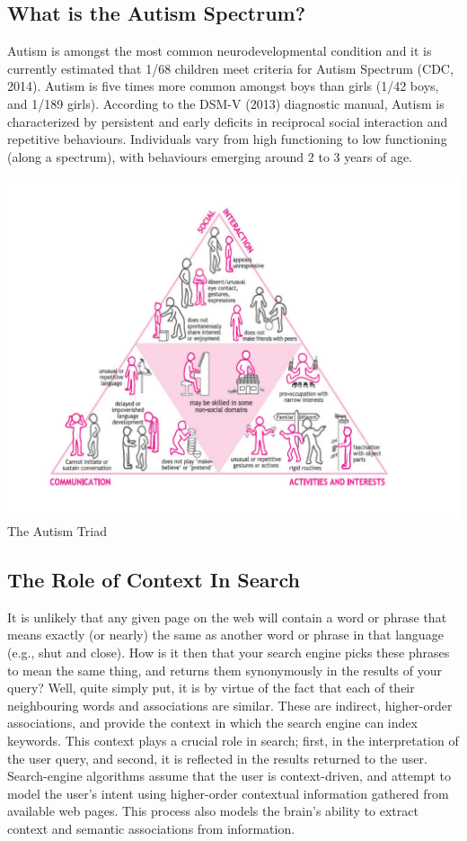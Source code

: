 \documentclass[10pt]{article}
\begin{document}
\subsection{What is the Autism Spectrum?}
Autism is amongst the most common neurodevelopmental condition and it is currently estimated that 1/68 children meet criteria for Autism Spectrum (CDC, 2014). Autism is five times more common amongst boys than girls (1/42 boys, and 1/189 girls). According to the DSM-V (2013) diagnostic manual, Autism is characterized by persistent and early deficits in reciprocal social interaction and repetitive behaviours. Individuals vary from high functioning to low functioning (along a spectrum), with behaviours emerging around 2 to 3 years of age. 

\begin{center}
\includegraphics[scale=0.5]{asd}\\
The Autism Triad \cite{triad}
\end{center}

\subsection{The Role of Context In Search} \label{the problem}
It is unlikely that any given page on the web will contain a word or phrase that means exactly (or nearly) the same as another word or phrase in that language (e.g., shut and close). How is it then that your search engine picks these phrases to mean the same thing, and returns them synonymously in the results of your query? Well, quite simply put, it is by virtue of the fact that each of their neighbouring words and associations are similar. These are indirect, higher-order associations, and provide the context in which the search engine can index keywords. This context plays a crucial role in search; first, in the interpretation of the user query, and second, it is reflected in the results returned to the user.\\
Search-engine algorithms assume that the user is context-driven, and attempt to model the user's intent using higher-order contextual information gathered from available web pages. This process also models the brain's ability to extract context and semantic associations from information.\\
\end{document}

